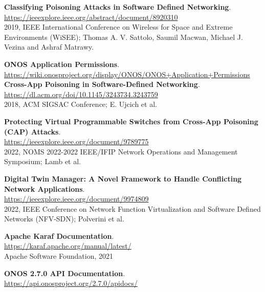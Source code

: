 \documentclass[a4paper,10pt]{memoir}
\begin{document}
{\begin{thebibliography}{9}
  \textbf{Classifying Poisoning Attacks in Software Defined Networking}.\\
  \href{https://ieeexplore.ieee.org/abstract/document/8920310}{https://ieeexplore.ieee.org/abstract/document/8920310}\\
  2019, IEEE International Conference on Wireless for Space and Extreme Environments (WiSEE); Thomas A. V. Sattolo, Saumil Macwan, Michael J. Vezina and Ashraf Matrawy.
 
  \textbf{ONOS Application Permissions}.\\
  \href{https://wiki.onosproject.org/display/ONOS/ONOS+Application+Permissions}{https://wiki.onosproject.org/display/ONOS/ONOS+Application+Permissions}\\

  \textbf{Cross-App Poisoning in Software-Defined Networking}.\\
  \href{https://dl.acm.org/doi/10.1145/3243734.3243759}{https://dl.acm.org/doi/10.1145/3243734.3243759}\\
  2018, ACM SIGSAC Conference; E. Ujcich et al.

  \textbf{Protecting Virtual Programmable Switches from Cross-App Poisoning (CAP) Attacks}.\\
  \href{https://ieeexplore.ieee.org/document/9789775}{https://ieeexplore.ieee.org/document/9789775}\\
  2022, NOMS 2022-2022 IEEE/IFIP Network Operations and Management Symposium; Lamb et al.

  \textbf{Digital Twin Manager: A Novel Framework to Handle Conflicting Network Applications}.\\
  \href{https://ieeexplore.ieee.org/document/9974809}{https://ieeexplore.ieee.org/document/9974809}\\
  2022, IEEE Conference on Network Function Virtualization and Software Defined Networks (NFV-SDN); Polverini et al.

  \textbf{Apache Karaf Documentation}.\\
  \href{https://karaf.apache.org/manual/latest/}{https://karaf.apache.org/manual/latest/}\\
  Apache Software Foundation, 2021

  \textbf{ONOS 2.7.0 API Documentation}.\\
  \href{https://api.onosproject.org/2.7.0/apidocs/}{https://api.onosproject.org/2.7.0/apidocs/}\\


\end{thebibliography}}
\end{document}

